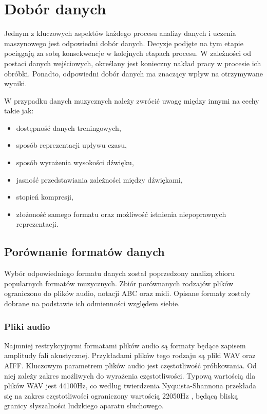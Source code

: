 \chapter {Dobór danych} 
{
    Jednym z kluczowych aspektów każdego procesu analizy danych i uczenia maszynowego
    jest odpowiedni dobór danych. Decyzje podjęte na tym etapie pociągają za sobą 
    konsekwencje w kolejnych etapach procesu. W zależności od postaci danych wejściowych,
    określany jest konieczny nakład pracy w procesie ich obróbki. 
    Ponadto, odpowiedni dobór danych ma znaczący wpływ na otrzymywane wyniki.

    W przypadku danych muzycznych należy zwrócić uwagę między innymi na cechy takie jak:
    \begin{itemize}
        \setlength\itemsep{-0.5em}
        \item dostępność danych treningowych,
        \item sposób reprezentacji upływu czasu,
        \item sposób wyrażenia wysokości dźwięku,
        \item jasność przedstawiania zależności między dźwiękami,
        \item stopień kompresji,
        \item złożoność samego formatu oraz możliwość istnienia niepoprawnych reprezentacji.
    \end{itemize}

    \section{Porównanie formatów danych}
    {
        Wybór odpowiedniego formatu danych został poprzedzony analizą zbioru popularnych formatów muzycznych.
        Zbiór porównanych rodzajów plików ograniczono do plików audio, notacji ABC oraz midi.
        Opisane formaty zostały dobrane na podstawie ich odmienności względem siebie.

        \subsection{Pliki audio}
        {
            Najmniej restrykcyjnymi formatami plików audio są formaty będące zapisem
            amplitudy fali akustycznej. Przykładami plików tego rodzaju są pliki WAV
            oraz AIFF.
            Kluczowym parametrem plików audio jest częstotliwość próbkowania. Od niej
            zależy zakres możliwych do wyrażenia częstotliwości. Typową wartością dla plików
            WAV jest 44100Hz, co według twierdzenia Nyquista-Shannona przekłada się na zakres
            częstotliwości ograniczony wartością 22050Hz \cite{Shannon1949CommunicationIT}, będącą bliską granicy słyszalności
            ludzkiego aparatu słuchowego. 

}}}
